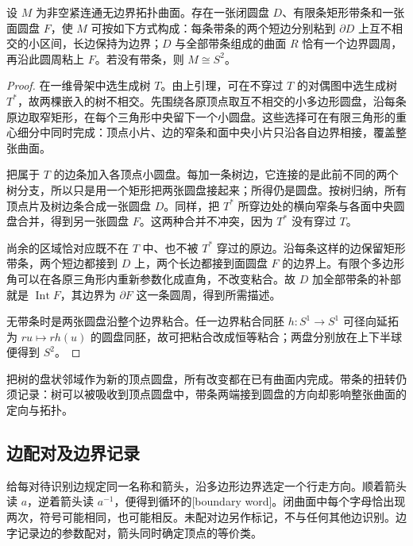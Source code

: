 \begin{proposition}\label{g1:prop:one-vertex-band-model}
	设 \(M\) 为非空紧连通无边界拓扑曲面。存在一张闭圆盘 \(D\)、有限条矩形带条和一张面圆盘 \(F\)，使 \(M\) 可按如下方式构成：每条带条的两个短边分别粘到 \(\partial D\) 上互不相交的小区间，长边保持为边界；\(D\) 与全部带条组成的曲面 \(R\) 恰有一个边界圆周，再沿此圆周粘上 \(F\)。若没有带条，则 \(M\cong S^2\)。
\end{proposition}
\begin{proof}
	在一维骨架中选生成树 \(T\)。由上引理，可在不穿过 \(T\) 的对偶图中选生成树 \(T^*\)，故两棵嵌入的树不相交。先围绕各原顶点取互不相交的小多边形圆盘，沿每条原边取窄矩形，在每个三角形中央留下一个小圆盘。这些选择可在有限三角形的重心细分中同时完成：顶点小片、边的窄条和面中央小片只沿各自边界相接，覆盖整张曲面。

	把属于 \(T\) 的边条加入各顶点小圆盘。每加一条树边，它连接的是此前不同的两个树分支，所以只是用一个矩形把两张圆盘接起来；所得仍是圆盘。按树归纳，所有顶点片及树边条合成一张圆盘 \(D\)。同样，把 \(T^*\) 所穿边处的横向窄条与各面中央圆盘合并，得到另一张圆盘 \(F\)。这两种合并不冲突，因为 \(T^*\) 没有穿过 \(T\)。

	尚余的区域恰对应既不在 \(T\) 中、也不被 \(T^*\) 穿过的原边。沿每条这样的边保留矩形带条，两个短边都接到 \(D\) 上，两个长边都接到面圆盘 \(F\) 的边界上。有限个多边形角可以在各原三角形内重新参数化成直角，不改变粘合。故 \(D\) 加全部带条的补部就是 \(\operatorname{Int}F\)，其边界为 \(\partial F\) 这一条圆周，得到所需描述。

	无带条时是两张圆盘沿整个边界粘合。任一边界粘合同胚 \(h:S^1\to S^1\) 可径向延拓为 \(ru\mapsto r h(u)\) 的圆盘同胚，故可把粘合改成恒等粘合；两盘分别放在上下半球便得到 \(S^2\)。
\end{proof}

把树的盘状邻域作为新的顶点圆盘，所有改变都在已有曲面内完成。带条的扭转仍须记录：树可以被吸收到顶点圆盘中，带条两端接到圆盘的方向却影响整张曲面的定向与拓扑。

\subsection{边配对及边界记录}
\label{g1:subsec:0603:02}

给每对待识别边规定同一名称和箭头，沿多边形边界选定一个行走方向。顺着箭头读 \(a\)，逆着箭头读 \(a^{-1}\)，便得到循环的[boundary word]。闭曲面中每个字母恰出现两次，符号可能相同，也可能相反。未配对边另作标记，不与任何其他边识别。边字记录边的参数配对，箭头同时确定顶点的等价类。

